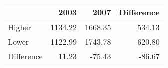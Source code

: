 \begin{tabular}{lrrr}
\toprule
{} &     2003 &     2007 &  Difference \\
\midrule
Higher     &  1134.22 &  1668.35 &      534.13 \\
Lower      &  1122.99 &  1743.78 &      620.80 \\
Difference &    11.23 &   -75.43 &      -86.67 \\
\bottomrule
\end{tabular}
